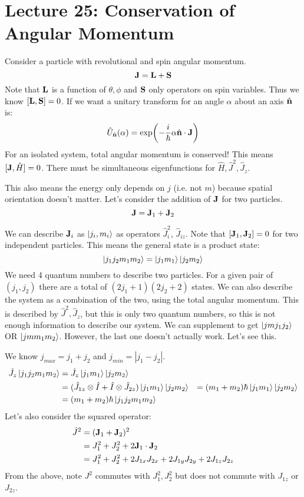 \section{Lecture 25: Conservation of Angular Momentum} 

Consider a particle with revolutional and spin angular momentum.
\[ \mathbf{J} = \mathbf{L} + \mathbf{S} \]
Note that $\mathbf{L}$ is a function of $\theta, \phi$ and $\mathbf{S}$ only operators on spin variables. Thus we know $[\mathbf{L}, \mathbf{S}] = 0$.
If we want a unitary transform for an angle $\alpha$ about an axis $\hat{\mathbf{n}}$ is:
\[ \hat{U}_{\hat{\mathbf{n}}}(\alpha) = \exp(-\frac{i}{\hbar} \alpha \hat{\mathbf{n}} \cdot \mathbf{J}) \]
For an isolated system, total angular momentum is conserved! This means $[\mathbf{J}, \hat{H}] = 0$. There must be
simultaneous eigenfunctions for $\hat{H}, \hat{J}^2, \hat{J}_z$.

This also means the energy only depends on $j$ (i.e. not $m$) because spatial orientation doesn't matter. Let's consider the addition of
$\mathbf{J}$ for two particles.
\[ \mathbf{J} = \mathbf{J}_1 + \mathbf{J}_2 \]

We can describe $\mathbf{J}_i$ as $\ket{j_i, m_i}$ as operators $\hat{J}^2_i$, $\hat{J}_{iz}$. Note that $[\mathbf{J}_1, \mathbf{J}_2] = 0 $ for two independent particles.
This means the general state is a product state:
\[ \ket{j_1 j_2 m_1 m_2} = \ket{j_1 m_1} \ket{j_2 m_2} \]
We need 4 quantum numbers to describe two particles. For a given pair of $(j_1, j_2)$ there are a total of $(2j_1 + 1)(2j_2 + 2)$ states. We
can also describe the system as a combination of the two, using the total angular momentum. This is described by $\hat{J}^2, \hat{J}_z$, but this is only two
quantum numbers, so this is not enough information to describe our system. We can supplement to get $\ket{j m j_1 j_2}$ OR $\ket{j m m_1 m_2}$. However,
the last one doesn't actually work. Let's see this.

We know $j_{max} = j_1 + j_2$ and $j_{min} = |j_1 - j_2|$.
\begin{align*}
    \hat{J}_z \ket{j_1 j_2 m_1 m_2} &= \hat{J}_z \ket{j_1 m_1} \ket{j_2 m_2} \\
    &= (\hat{J}_{1z} \otimes \hat{I} + \hat{I} \otimes \hat{J}_{2z}) \ket{j_1 m_1} \ket{j_2 m_2}
    &= (m_1 + m_2)\hbar \ket{j_1 m_1} \ket{j_2 m_2} \\
    &= (m_1 + m_2)\hbar \ket{j_1 j_2 m_1 m_2}
\end{align*}
Let's also consider the squared operator:
\begin{align*}
    \hat{J}^2 &= (\mathbf{J}_1 + \mathbf{J}_2)^2 \\
    &= J_1^2 + J_2^2 + 2 \mathbf{J}_1 \cdot \mathbf{J}_2 \\
    &= J_1^2 + J_2^2 + 2J_{1x}J_{2x} + 2 J_{1y} J_{2y} + 2 J_{1z} J_{2z}
\end{align*}
From the above, note $J^2$ commutes with $J_1^2, J_2^2$ but does not commute with $J_{1z}$ or $J_{2z}$.

